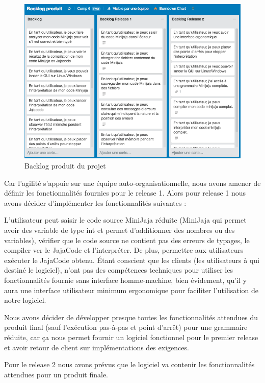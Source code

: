 \documentclass[a4paper,12pt]{article}
\begin{document}
\begin{figure}[H]
\begin{center}
	\includegraphics[scale=0.3]{backlogproduit}
	\caption{Backlog produit du projet}
\end{center}
\end{figure}

Car l'agilité s'appuie sur une équipe auto-organisationnelle, nous avons amener de définir les fonctionnalités fournies pour le release 1.  Alors pour release 1 nous avons décider  d'implémenter les fonctionnalités suivantes :

L'utilisateur peut saisir le code source MiniJaja réduite (MiniJaja qui permet avoir des variable de type int et permet d'additionner des nombres ou des variables), vérifier que le code source ne contient pas des erreurs de typages, le compiler ver le JajaCode et l'interpréter. De plus, permettre aux utilisateurs exécuter le JajaCode obtenu. Étant conscient que les clients (les utilisateurs à qui destiné le logiciel), n'ont pas des compétences techniques pour utiliser les fonctionnalités fournie sans interface homme-machine, bien évidement, qu'il y aura une interface utilisateur minimum ergonomique pour faciliter l'utilisation de notre logiciel.
 
Nous avons décider de développer presque toutes les fonctionnalités attendues du produit final (sauf l'exécution pas-à-pas et point d'arrêt) pour une grammaire réduite, car ça nous permet fournir un logiciel fonctionnel pour le premier release et avoir retour de client sur implémentations des exigences.  

Pour le release 2 nous avons prévus que le logiciel va contenir les fonctionnalités attendues pour un produit finale. 
\end{document}
